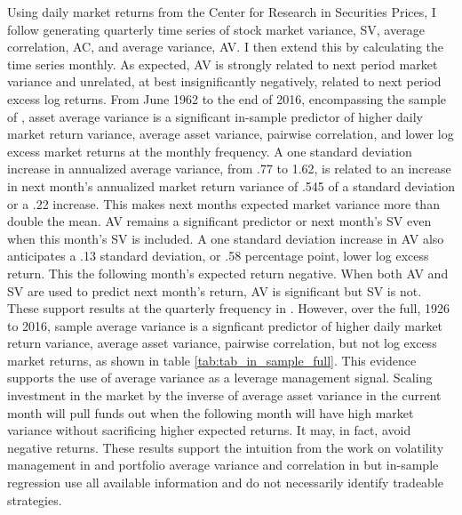 Using daily market returns from the Center for Research in Securities Prices, I follow \citet{pollet_average_2010} generating quarterly time series of stock market variance, SV, average correlation, AC, and average variance, AV. I then extend this by calculating the time series monthly. As expected, AV is strongly related to next period market variance and unrelated, at best insignificantly negatively, related to next period excess log returns. 
From June 1962 to the end of 2016, encompassing the sample of  \citet{pollet_average_2010}, asset average variance is a significant in-sample predictor of higher daily market return variance, average asset variance, pairwise correlation, and lower log excess market returns at the monthly frequency. A one standard deviation increase in annualized average variance, from .77 to 1.62, is related to an increase in next month’s annualized market return variance of .545 of a standard deviation or a .22 increase. This makes next months expected market variance more than double the mean. AV remains a significant predictor or next month's SV even when this month's SV is included. A one standard deviation increase in AV also anticipates a .13 standard deviation, or .58 percentage point,  lower log excess return. This the following month's expected return negative. When both AV and SV are used to predict next month's return, AV is significant but SV is not. These support results at the quarterly frequency in \citet{pollet_average_2010}. However, over the full, 1926 to 2016, sample average variance is a signficant predictor of higher daily market return variance, average asset variance, pairwise correlation, but not log excess market returns, as shown in table \ref{tab:tab_in_sample_full}. This evidence supports the use of average variance as a leverage management signal. Scaling investment in the market by the inverse of average asset variance in the current month will pull funds out when the following month will have high market variance without sacrificing higher expected returns. It may, in fact, avoid negative returns. These results support the intuition from the work on volatility management in \citet{moreira_volatility-managed_2017} and portfolio average variance and correlation in \citet{pollet_average_2010} but in-sample regression use all available information and do not necessarily identify tradeable strategies.\citep{Welch2008}

